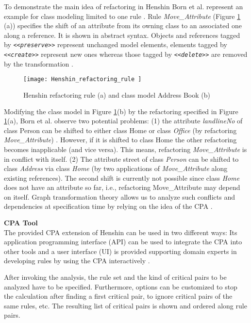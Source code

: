 \begin{example}
To demonstrate the main idea of refactoring in Henshin Born et al. represent an example for class modeling limited to one rule \cite{born2016algorithm}. Rule \emph{Move\_Attribute} (Figure \ref{fig:henshin_refractoring_rule} (a)) specifies the shift of an attribute from its owning class to an associated one along a reference. It is shown in abstract syntax. Objects and references tagged by \emph{\texttt{<<preserve>>}} represent unchanged model elements, elements tagged by \emph{\texttt{<<create>>}} represent new ones whereas those tagged by \emph{\texttt{<<delete>>}} are removed by the transformation \cite{mens2007analysing}.


\begin{figure}
\center
\texttt{[image: Henshin\_refactoring\_rule ]}
\caption{Henshin refactoring rule (a) and class model Address Book (b) \cite{mens2007analysing} }\label{fig:henshin_refractoring_rule}
\end{figure}
Modifying the class model in Figure \ref{fig:henshin_refractoring_rule}(b) by the refactoring specified in Figure \ref{fig:henshin_refractoring_rule}(a), Born et al. observe two potential problems: (1) the attribute \emph{landlineNo} of class Person can be shifted to either class Home or class \emph{Office} (by refactoring\emph{ Move\_Attribute}) \cite{mens2007analysing}. However, if it is shifted to class Home the other refactoring becomes inapplicable (and vice versa). This means, refactoring \emph{Move\_Attribute} is in conflict with itself. (2) The attribute street of class \emph{Person} can be shifted to class \emph{Address} via class \emph{Home} (by two applications of\emph{ Move\_Attribute} along existing references). The second shift is currently not possible since class \emph{Home} does not have an attribute so far, i.e., refactoring Move\_Attribute may depend on itself. Graph transformation theory allows us to analyze such conﬂicts and dependencies at speciﬁcation time by relying on the idea of the CPA \cite{mens2007analysing}.
\end{example}
\textbf{CPA Tool}\\
The provided CPA extension of Henshin can be used in two diﬀerent ways: Its application programming interface (API) can be used to integrate the CPA into other tools and a user interface (UI) is provided supporting domain experts in developing rules by using the CPA interactively \cite{mens2007analysing}.

After invoking the analysis, the rule set and the kind of critical pairs to be analyzed have to be speciﬁed. Furthermore, options can be customized to stop the calculation after ﬁnding a ﬁrst critical pair, to ignore critical pairs of the same rules, etc. The resulting list of critical pairs is shown and ordered along rule pairs. 

